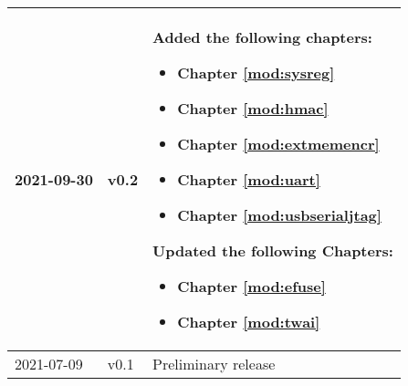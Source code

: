 \begin{longtable}[l]{ | m{2cm} | m{1.5cm} | m{12cm} | }
    2021-09-30      & v0.2 &

            Added the following chapters:
            \begin{itemize}
                \item Chapter \ref{mod:sysreg} \textit{\nameref{mod:sysreg}}
                \item Chapter \ref{mod:hmac} \textit{\nameref{mod:hmac}}
                \item Chapter \ref{mod:extmemencr} \textit{\nameref{mod:extmemencr}}
                \item Chapter \ref{mod:uart} \textit{\nameref{mod:uart}}
                \item Chapter \ref{mod:usbserialjtag} \textit{\nameref{mod:usbserialjtag}}
            \end{itemize}
            Updated the following Chapters:
            \begin{itemize}
                \item Chapter \ref{mod:efuse} \textit{\nameref{mod:efuse}}
                \item Chapter \ref{mod:twai} \textit{\nameref{mod:twai}}
            \end{itemize}

            \\\hline
    2021-07-09 & v0.1 & Preliminary release\\\hline
\end{longtable}

